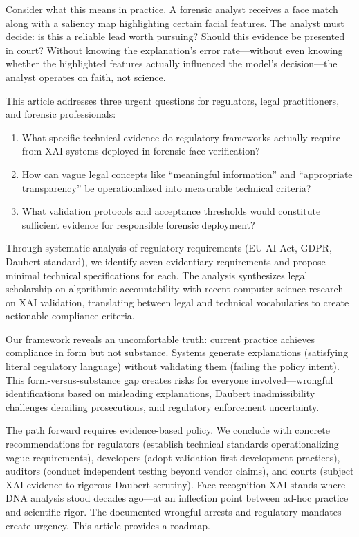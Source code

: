 Consider what this means in practice. A forensic analyst receives a face match along with a saliency map highlighting certain facial features. The analyst must decide: is this a reliable lead worth pursuing? Should this evidence be presented in court? Without knowing the explanation's error rate—without even knowing whether the highlighted features actually influenced the model's decision—the analyst operates on faith, not science.

This article addresses three urgent questions for regulators, legal practitioners, and forensic professionals:

\begin{enumerate}[itemsep=0pt]
    \item What specific technical evidence do regulatory frameworks actually require from XAI systems deployed in forensic face verification?
    \item How can vague legal concepts like ``meaningful information'' and ``appropriate transparency'' be operationalized into measurable technical criteria?
    \item What validation protocols and acceptance thresholds would constitute sufficient evidence for responsible forensic deployment?
\end{enumerate}

Through systematic analysis of regulatory requirements (EU AI Act, GDPR, Daubert standard), we identify seven evidentiary requirements and propose minimal technical specifications for each. The analysis synthesizes legal scholarship on algorithmic accountability with recent computer science research on XAI validation, translating between legal and technical vocabularies to create actionable compliance criteria.

Our framework reveals an uncomfortable truth: current practice achieves compliance in form but not substance. Systems generate explanations (satisfying literal regulatory language) without validating them (failing the policy intent). This form-versus-substance gap creates risks for everyone involved—wrongful identifications based on misleading explanations, Daubert inadmissibility challenges derailing prosecutions, and regulatory enforcement uncertainty.

The path forward requires evidence-based policy. We conclude with concrete recommendations for regulators (establish technical standards operationalizing vague requirements), developers (adopt validation-first development practices), auditors (conduct independent testing beyond vendor claims), and courts (subject XAI evidence to rigorous Daubert scrutiny). Face recognition XAI stands where DNA analysis stood decades ago—at an inflection point between ad-hoc practice and scientific rigor. The documented wrongful arrests and regulatory mandates create urgency. This article provides a roadmap.
